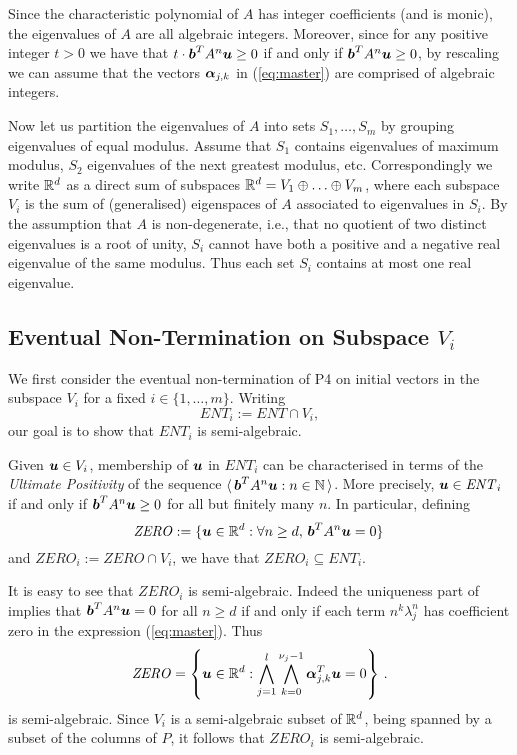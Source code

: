 Since the characteristic polynomial of $A$ has integer coefficients (and is monic), the eigenvalues of $A$ are all algebraic integers.  Moreover, since for any positive integer $t>0$ we have that $t\cdot \boldsymbol{b}^TA^n\boldsymbol{u} \geq 0$ if and only if $\boldsymbol{b}^TA^n\boldsymbol{u}\geq 0$, by rescaling we can assume that the vectors $\boldsymbol{\alpha}_{j,k}$ in (\ref{eq:master}) are comprised of algebraic integers.

Now let us partition the eigenvalues of $A$ into sets $S_1,\ldots,S_m$
by grouping eigenvalues of equal modulus.  Assume that $S_1$ contains
eigenvalues of maximum modulus, $S_2$ eigenvalues of the next greatest
modulus, etc.  Correspondingly we write $\mathbb{R}^{d}$ as a
direct sum of subspaces $\mathbb{R}^{d} = V_1 \oplus \ldots \oplus V_m$,
where each subspace $V_i$ is the sum of (generalised) eigenspaces of
$A$ associated to eigenvalues in $S_i$.  By the assumption that $A$ is
non-degenerate, i.e., that no quotient of two distinct eigenvalues is
a root of unity, $S_i$ cannot have both a positive and a negative real
eigenvalue of the same modulus.  Thus each set $S_i$ contains at most one
real eigenvalue.

\subsection{Eventual Non-Termination on Subspace $V_i$}
We first consider the eventual non-termination of \textsf{P4} on
initial vectors in the subspace $V_i$ for a fixed $i \in
\{1,\ldots,m\}$.  Writing
\begin{equation*}
  \mathit{ENT}_i := \mathit{ENT} \cap V_i,
\end{equation*}
our goal is to show that $\mathit{ENT}_i$ is semi-algebraic.

Given $\boldsymbol{u} \in V_i$, membership of $\boldsymbol{u}$ in
$\mathit{ENT}_i$ can be characterised in terms of the \emph{Ultimate Positivity} of the sequence $\langle\,
\boldsymbol{b}^TA^n\boldsymbol{u}:n\in\mathbb{N}\,\rangle$.  More
precisely, $\boldsymbol{u} \in \mathit{ENT}_i$ if and only if
$\boldsymbol{b}^TA^n\boldsymbol{u} \geq 0$ for all but finitely many
$n$.  In particular, defining
\[ \mathit{ZERO}:=\{\boldsymbol{u} \in \mathbb{R}^{d}: \forall
n\geq d,\, \boldsymbol{b}^TA^n\boldsymbol{u}=0 \} \, \] and
$\mathit{ZERO}_i:=\mathit{ZERO}\cap V_i$, we have that
$\mathit{ZERO}_i\subseteq \mathit{ENT}_i$.

It is easy to see that $\mathit{ZERO}_i$ is semi-algebraic.  Indeed
the uniqueness part of~\cite[Proposition 2.11]{TUCS05} implies that
$\boldsymbol{b}^TA^n\boldsymbol{u}=0$ for all $n\geq d$ if and only if
each term $n^k\lambda_j^n$ has coefficient zero in the expression
(\ref{eq:master}).  Thus
\[ \mathit{ZERO} = \left\{ \boldsymbol{u}\in \mathbb{R}^{d} :
\bigwedge_{j=1}^{l}\bigwedge_{k=0}^{\nu_j-1}
\boldsymbol{\alpha}_{j,k}^T\boldsymbol{u}= 0 \right\} \, .\] is
semi-algebraic.  Since $V_i$ is a semi-algebraic subset of
$\mathbb{R}^{d}$, being spanned by a subset of the columns of $P$, it
follows that $\mathit{ZERO}_i$ is semi-algebraic.

